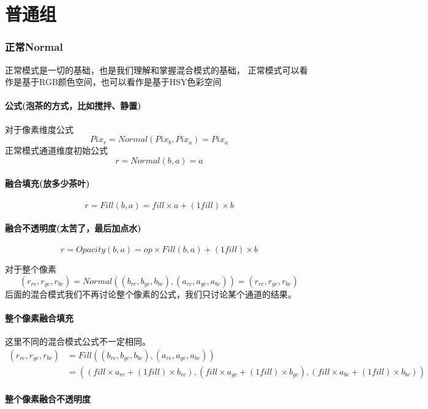
\chapter{普通组}

\subsection{ 正常Normal}

正常模式是一切的基础，也是我们理解和掌握混合模式的基础，
正常模式可以看作是基于RGB颜色空间，也可以看作是基于HSY色彩空间

\subsubsection{ 公式(泡茶的方式，比如搅拌、静置)}

对于像素维度公式
$$Pix_r=Normal(Pix_b,Pix_a)=Pix_a$$
正常模式通道维度初始公式
$$r=Normal(b,a)=a$$

\subsubsection{ 融合填充(放多少茶叶)}

$$r=Fill(b,a)= fill\times a + (1fill)\times b$$

\subsubsection{ 融合不透明度(太苦了，最后加点水)}
$$r=Opacity(b,a)= op\times Fill(b,a) + (1fill)\times b$$

对于整个像素
$$(r_{rc},r_{gc},r_{bc})=Normal((b_{rc},b_{gc},b_{bc}),(a_{rc},a_{gc},a_{bc}))=(r_{rc},r_{gc},r_{bc})$$
后面的混合模式我们不再讨论整个像素的公式，我们只讨论某个通道的结果。

\subsubsection{ 整个像素融合填充}

这里不同的混合模式公式不一定相同。
$$\begin{aligned}(r_{rc},r_{gc},r_{bc})&=Fill((b_{rc},b_{gc},b_{bc}),(a_{rc},a_{gc},a_{bc}))\\&=\left((fill\times a_{rc} + (1fill)\times b_{rc}),(fill\times a_{gc} + (1fill)\times b_{gc}),(fill\times a_{bc} + (1fill)\times b_{bc})\right)\end{aligned}$$

\subsubsection{ 整个像素融合不透明度}

